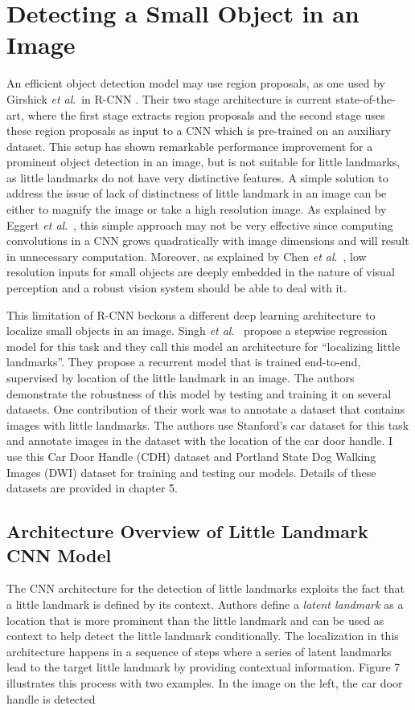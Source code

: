 \documentclass [11pt,letterpaper ,openany ]{report}
\begin{document}
    \chapter{Detecting a Small Object in an Image}
    \doublespacing
    An efficient object detection model may use region proposals, as  one used by Girshick \textit{et al}.\ in R-CNN \cite{girshick2014rich, ren2015faster}. Their two stage architecture is current state-of-the-art, where the first stage extracts region proposals and the second stage uses these region proposals as input to a CNN which is pre-trained on an auxiliary dataset. This setup has shown remarkable performance improvement for a prominent object detection in an image, but is not suitable for little landmarks, as little landmarks do not have very distinctive features. A simple solution to address the issue of lack of distinctness of little landmark in an image can be either to magnify the image or take a high resolution image. As explained by Eggert \textit{et al}.\ \cite{eggert2017improving}, this simple approach may not be very effective since computing convolutions in a CNN grows quadratically with image dimensions and will result in unnecessary computation. Moreover, as explained by Chen \textit{et al}.\ \cite{chen2016r}, low resolution inputs for small objects are deeply embedded  in the nature of visual perception and a robust vision system should be able to deal with it.
        
    This limitation of R-CNN beckons a different deep learning architecture to localize small objects in an image. Singh \textit{et al}.\ \cite{Singh_2016_CVPR} propose a stepwise regression model for this task and they call this model an architecture for ``localizing little landmarks''. They propose a recurrent model that is trained end-to-end, supervised by location of the little landmark in an image. The authors demonstrate the robustness of this model by testing and training it on several datasets. One contribution of their work was to annotate a dataset that contains images with little landmarks. The authors use Stanford's car dataset \cite{krause20133d} for this task and annotate images in the dataset with the location of the car door handle. I use this Car Door Handle (CDH) dataset and Portland State Dog Walking Images (DWI) dataset for training and testing our models. Details of these datasets are provided in chapter 5.

    \section{Architecture Overview of Little Landmark CNN Model}
    The CNN architecture for the detection of little landmarks \cite{Singh_2016_CVPR} exploits the fact that a little landmark is defined by its context. Authors define a \textit {latent landmark} as a location that is more prominent than the little landmark and can be used as context to help detect the little landmark conditionally. The localization in this architecture happens in a sequence of steps where a series of latent landmarks lead to the target little landmark by providing contextual information. Figure 7 illustrates this process with two examples. In the image on the left, the car door handle is detected
\end{document}
